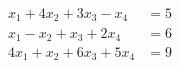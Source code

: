 \begin{align*}
x_1 + 4x_2 + 3x_3 - x_4 &= 5\\
x_1 - x_2 + x_3 + 2x_4 &= 6\\
4x_1 + x_2 + 6x_3 + 5x_4 &= 9
\end{align*}